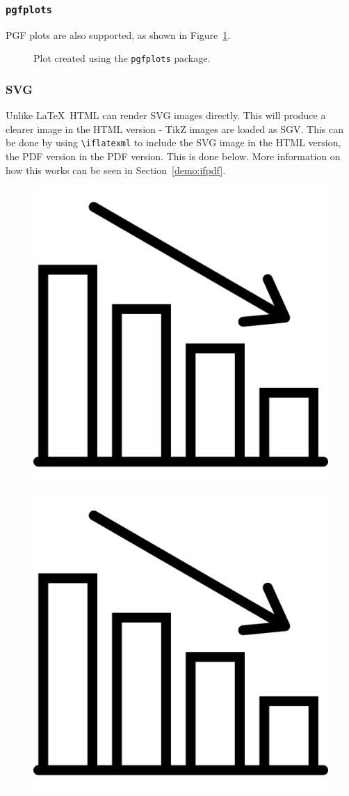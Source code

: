 \subsubsection{\texttt{pgfplots}}
\label{demo:fig:pgf}

PGF plots are also supported, as shown in Figure~\ref{fig:sqrt}.

\begin{figure}[H]
    \centering
    \caption{Plot created using the \texttt{pgfplots} package.}
    \label{fig:sqrt}
\end{figure}

\subsubsection{SVG}

Unlike \LaTeX\, HTML can render SVG images directly. This will produce a clearer image in the HTML version - TikZ images are loaded as SGV. This can be done by using \verb|\iflatexml| to include the SVG image in the HTML version, the PDF version in the PDF version. This is done below. More information on how this works can be seen in Section~\ref{demo:ifpdf}.


\iflatexml
\begin{figure}[H]
    \centering
    \includegraphics[width=0.25\linewidth, alt={Generic bar graphic chart with an arrow to indicate downward trend}]{img/graph.svg}
    \label{fig:graph}
\end{figure}
\else
\begin{figure}[H]
    \centering
    \includegraphics[width=0.25\linewidth, alt={Generic bar chart with an arrow to indicate downward trend}]{img/graph.pdf}
    \label{fig:graph}
\end{figure}
\fi

